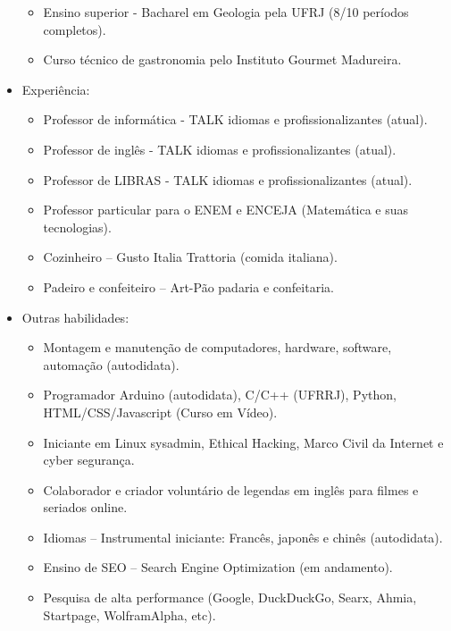 \documentclass[11pt, a4paper]{article}
\begin{document}
\begin{itemize}
\begin{itemize}
                \item[]Ensino superior - Bacharel em Geologia pela UFRJ (8/10 períodos completos).
                \item[]Curso técnico de gastronomia pelo Instituto Gourmet Madureira.
            \end{itemize}
        \item[]Experiência:
            \begin{itemize}
                \item[] Professor de informática - TALK idiomas e profissionalizantes (atual).
                \item[]Professor de inglês - TALK idiomas e profissionalizantes (atual).
                \item[]Professor de LIBRAS - TALK idiomas e profissionalizantes (atual).
                \item[]Professor particular para o ENEM e ENCEJA (Matemática e suas tecnologias).
                \item[]Cozinheiro – Gusto Italia Trattoria (comida italiana).
                \item[]Padeiro e confeiteiro – Art-Pão padaria e confeitaria.
            \end{itemize}
        \item[]Outras habilidades:
            \begin{itemize}
                \item[]Montagem e manutenção de computadores, hardware, software, automação (autodidata).
                \item[]Programador Arduino (autodidata), C/C++ (UFRRJ), Python, HTML/CSS/Javascript (Curso em Vídeo).
                \item[]Iniciante em Linux sysadmin, Ethical Hacking, Marco Civil da Internet e cyber segurança.
                \item[]Colaborador e criador voluntário de legendas em inglês para filmes e seriados online.
                \item[]Idiomas – Instrumental iniciante: Francês, japonês e chinês (autodidata).
                \item[]Ensino de SEO – Search Engine Optimization (em andamento).
                \item[]Pesquisa de alta performance (Google, DuckDuckGo, Searx, Ahmia, Startpage, WolframAlpha, etc).
            \end{itemize}
    \end{itemize}
\end{document}
